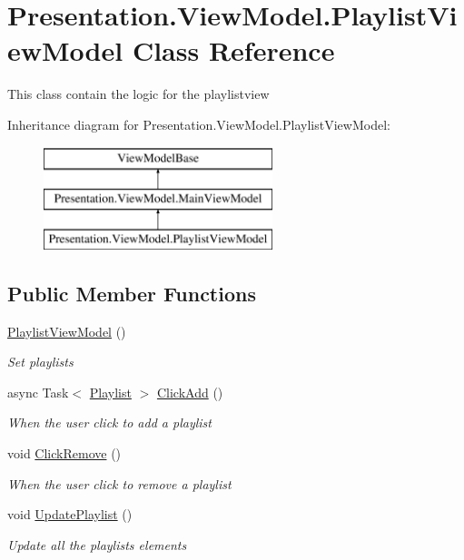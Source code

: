 \hypertarget{class_presentation_1_1_view_model_1_1_playlist_view_model}{}\section{Presentation.\+View\+Model.\+Playlist\+View\+Model Class Reference}
\label{class_presentation_1_1_view_model_1_1_playlist_view_model}


This class contain the logic for the playlistview  


Inheritance diagram for Presentation.\+View\+Model.\+Playlist\+View\+Model\+:\begin{figure}[H]
\begin{center}
\leavevmode
\includegraphics[height=3.000000cm]{class_presentation_1_1_view_model_1_1_playlist_view_model}
\end{center}
\end{figure}
\subsection*{Public Member Functions}
\begin{DoxyCompactItemize}
\item 
\hyperlink{class_presentation_1_1_view_model_1_1_playlist_view_model_a2465d55b6ed6c3de83bd1547fb95e1a3}{Playlist\+View\+Model} ()
\begin{DoxyCompactList}\small\item\em Set playlists \end{DoxyCompactList}\item 
async Task$<$ \hyperlink{class_d_t_o_1_1_entity_1_1_playlist}{Playlist} $>$ \hyperlink{class_presentation_1_1_view_model_1_1_playlist_view_model_a3f24674bdebf1cd67215ed847eb39624}{Click\+Add} ()
\begin{DoxyCompactList}\small\item\em When the user click to add a playlist \end{DoxyCompactList}\item 
void \hyperlink{class_presentation_1_1_view_model_1_1_playlist_view_model_aca79c8f84c21bfe3c1ab2cc48c1cc76f}{Click\+Remove} ()
\begin{DoxyCompactList}\small\item\em When the user click to remove a playlist \end{DoxyCompactList}\item 
void \hyperlink{class_presentation_1_1_view_model_1_1_playlist_view_model_a251fc433a805e640e40769120160b645}{Update\+Playlist} ()
\begin{DoxyCompactList}\small\item\em Update all the playlists elements \end{DoxyCompactList}\end{DoxyCompactItemize}
